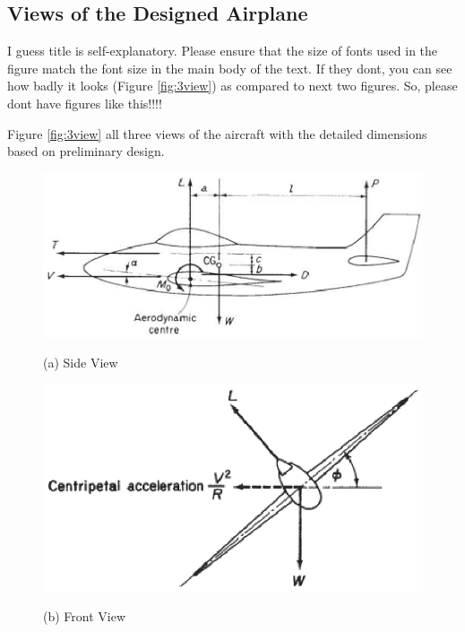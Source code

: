 \subsection{Views of the Designed Airplane}
I guess title is self-explanatory.
Please ensure that the size of fonts used in the figure match the font size in the main body of the text.
If they dont, you can see how badly it looks (Figure \ref{fig:3view}) as compared to next two figures.
So, please dont have figures like this!!!!

Figure \ref{fig:3view} all three views of the aircraft with the detailed dimensions based on preliminary design.
%
\begin{figure}
\centering
\begin{minipage}{0.5\textwidth}
\begin{centering}
\includegraphics[width=\textwidth]{figures/side_view.eps}
\centerline{\small (a) Side View}
\end{centering}
\end{minipage}
\hspace{2mm}
\begin{minipage}{0.4\textwidth}
\begin{centering}
\includegraphics[width=\textwidth]{figures/front_view.eps}
\centerline{\small (b) Front View}
\end{centering}

\end{minipage}
\end{figure}
